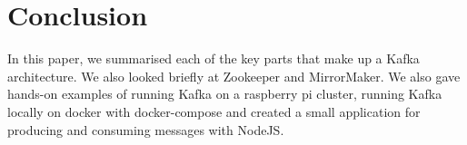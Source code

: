 \section{Conclusion}

In this paper, we summarised each of the key parts that make up a Kafka architecture. We also looked briefly at Zookeeper and MirrorMaker. We also gave hands-on examples of running Kafka on a raspberry pi cluster, running Kafka locally on docker with docker-compose and created a small application for producing and consuming messages with NodeJS.